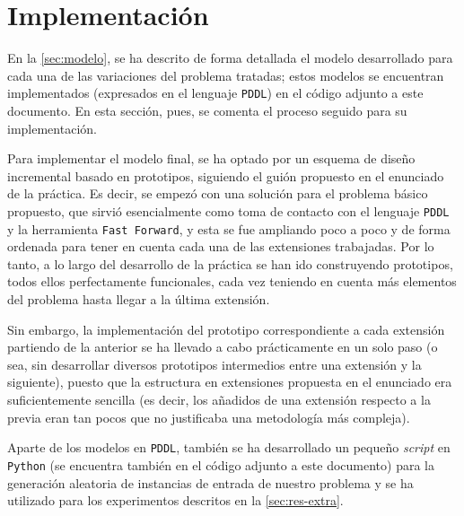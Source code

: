 
\section{Implementación} \label{sec:implem}

En la \autoref{sec:modelo}, se ha descrito de forma detallada el modelo 
desarrollado para cada una de las variaciones del problema tratadas; estos 
modelos se encuentran implementados (expresados en el lenguaje \texttt{PDDL}) 
en el código adjunto a este documento. En esta sección, pues, se comenta el 
proceso seguido para su implementación. 

Para implementar el modelo final, se ha optado por un esquema de diseño 
incremental basado en prototipos, siguiendo el guión propuesto en el enunciado 
de la práctica. Es decir, se empezó con una solución para el problema básico 
propuesto, que sirvió esencialmente como toma de contacto con el lenguaje 
\texttt{PDDL} y la herramienta \texttt{Fast Forward}, y esta se fue ampliando 
poco a poco y de forma ordenada para tener en cuenta cada una de las 
extensiones trabajadas. Por lo tanto, a lo largo del desarrollo de la práctica 
se han ido construyendo prototipos, todos ellos perfectamente funcionales, 
cada vez teniendo en cuenta más elementos del problema hasta llegar a la 
última extensión. 

Sin embargo, la implementación del prototipo correspondiente a cada extensión 
partiendo de la anterior se ha llevado a cabo prácticamente en un solo paso 
(o sea, sin desarrollar diversos prototipos intermedios entre una extensión y 
la siguiente), puesto que la estructura en extensiones propuesta en el 
enunciado era suficientemente sencilla (es decir, los añadidos de una 
extensión respecto a la previa eran tan pocos que no justificaba una 
metodología más compleja).

Aparte de los modelos en \texttt{PDDL}, también se ha desarrollado un pequeño 
\textit{script} en \texttt{Python} (se encuentra también en el código adjunto 
a este documento) para la generación aleatoria de instancias de entrada de 
nuestro problema y se ha utilizado para los experimentos descritos en la 
\autoref{sec:res-extra}. 


\clearpage


